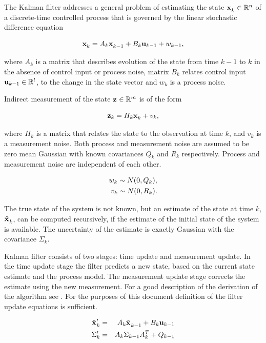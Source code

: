 The Kalman filter addresses a general problem of estimating the state $
\x{k}{}{} \in \Rset^n$ of a discrete-time controlled process that is
governed by the linear stochastic difference equation

\begin{equation}
\x{k}{}{} = A_k \x{k-1}{}{} + B_k \U{k-1} + w_{k-1},
\label{eqn:kalman_process}
\end{equation}

where $A_k$ is a matrix that describes evolution of the state from
time $k-1$ to $k$ in the absence of control input or process
noise, matrix $B_k$ relates control input ${\bf u}_{k-1} \in {\mathbb R}^l$, to
the change in the state vector and $w_k$ is a process noise.

Indirect measurement of the state ${\bf z}_{} \in {\mathbb R}^m$ is of the form

\begin{equation}
\z{k} = H_k \x{k}{}{} + v_k,
\label{eqn:kalman_obs}
\end{equation}

where $H_k$ is a matrix that relates the state to the observation at
time $k$, and $v_k$ is a measurement noise. Both process and
measurement noise are assumed to be zero mean Gaussian with known
covariances $Q_k$ and $R_k$ respectively. Process and measurement
noise are independent of each other.

\begin{eqnarray}
w_k \sample{}{} N(0,Q_k),\\
v_k \sample{}{} N(0,R_k).
\end{eqnarray}


The true state of the system is not known, but an estimate of the
state at time $k$, $\hat{\x{}{}{}}_k$, can be computed recursively, if
the estimate of the initial state of the system is available. The
uncertainty of the estimate is exactly Gaussian with the covariance
$\Sigma_k$.

Kalman filter consists of two stages: time update and measurement
update. In the time update stage the filter predicts a new state,
based on the current state estimate and the process model. The
measurement update stage corrects the estimate using the new
measurement. For a good description of the derivation of the algorithm
see \cite{kalman_intro}. For the purposes of this document definition
of the filter update equations is sufficient.


\begin{eqnarray}
\label{eqn:kalman_x_u}
\hat{\x{}{}{}}_k^\prime &=& A_k \hat{\x{}{}{}}_{k-1} + B_k \U{k-1}\\
\label{eqn:kalman_sigma_u}
\Sigma_k^\prime &=& A_k \Sigma_{k-1} A_k^T + Q_{k-1}
\end{eqnarray}

